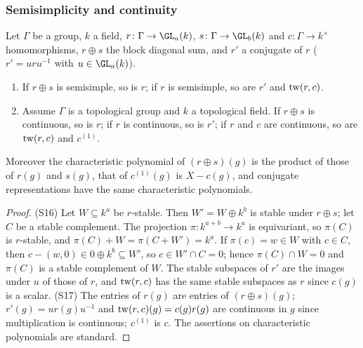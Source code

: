 \subsubsection{Semisimplicity and continuity}

\begin{proposition}[(S16), (S17)]\label{pf:geo:ssc}
Let $\Gamma$ be a group, $k$ a field, $r\colon\Gamma\to\GL_a(k)$, $s\colon\Gamma\to\GL_b(k)$ and
$c\colon\Gamma\to k^\times$ homomorphisms, $r\oplus s$ the block diagonal sum, and $r'$ a conjugate of $r$
($r'=uru^{-1}$ with $u\in\GL_a(k)$).
\begin{enumerate}[label=\textup{(S\arabic*)},start=16,nosep]
\item If $r\oplus s$ is semisimple, so is $r$; if $r$ is semisimple, so are $r'$ and $\mathrm{tw}(r,c)$.
\item Assume $\Gamma$ is a topological group and $k$ a topological field. If $r\oplus s$ is continuous, so is
  $r$; if $r$ is continuous, so is $r'$; if $r$ and $c$ are continuous, so are $\mathrm{tw}(r,c)$ and $c^{(1)}$.
\end{enumerate}
Moreover the characteristic polynomial of $(r\oplus s)(g)$ is the product of those of $r(g)$ and $s(g)$,
that of $c^{(1)}(g)$ is $X-c(g)$, and conjugate representations have the same characteristic polynomials.
\end{proposition}

\begin{proof}
(S16) Let $W\subseteq k^a$ be $r$-stable. Then $W'=W\oplus k^b$ is stable under $r\oplus s$; let $C$ be a
stable complement. The projection $\pi\colon k^{a+b}\to k^a$ is equivariant, so $\pi(C)$ is $r$-stable, and
$\pi(C)+W=\pi(C+W')=k^a$. If $\pi(c)=w\in W$ with $c\in C$, then $c-(w,0)\in0\oplus k^b\subseteq W'$, so $c\in W'\cap C=0$;
hence $\pi(C)\cap W=0$ and $\pi(C)$ is a stable complement of $W$. The stable subspaces of $r'$ are the
images under $u$ of those of $r$, and $\mathrm{tw}(r,c)$ has the same stable subspaces as $r$ since $c(g)$ is a
scalar. (S17) The entries of $r(g)$ are entries of $(r\oplus s)(g)$; $r'(g)=ur(g)u^{-1}$ and
$\mathrm{tw}(r,c)(g)=c(g)r(g)$ are continuous in $g$ since multiplication is continuous; $c^{(1)}$ is $c$. The
assertions on characteristic polynomials are standard.
\end{proof}

